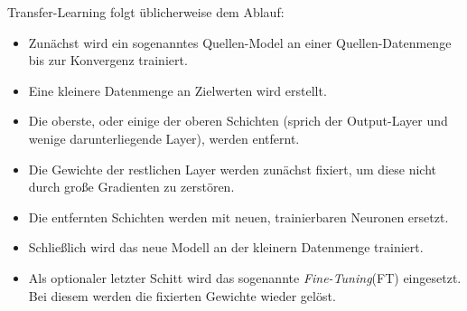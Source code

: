 Transfer-Learning folgt üblicherweise dem Ablauf:
\begin{itemize}
	\setlength\itemsep{0cm}
	\setlength{\parskip}{0cm}
	\item Zunächst wird ein sogenanntes Quellen-Model an einer Quellen-Datenmenge bis zur Konvergenz trainiert. 
	\item Eine kleinere Datenmenge an Zielwerten wird erstellt.
	\item Die oberste, oder einige der oberen Schichten (sprich der Output-Layer und wenige darunterliegende Layer), werden entfernt.
	\item Die Gewichte der restlichen Layer werden zunächst fixiert, um diese nicht durch große Gradienten zu zerstören.
	\item Die entfernten Schichten werden mit neuen, trainierbaren Neuronen ersetzt.
	\item Schließlich wird das neue Modell an der kleinern Datenmenge trainiert.
	\item Als optionaler letzter Schitt wird das sogenannte \textit{Fine-Tuning}(FT) eingesetzt. Bei diesem werden die fixierten Gewichte wieder gelöst.
\end{itemize}


